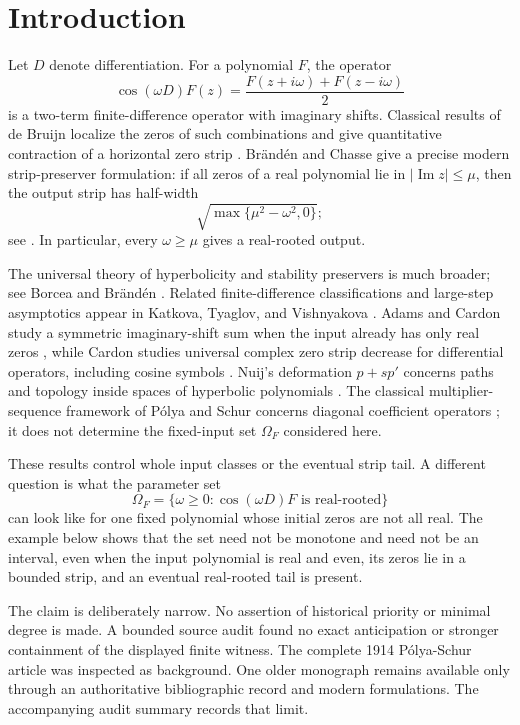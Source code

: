 \documentclass[11pt]{article}
\newcommand{\OmegaF}{\Omega_F}
\begin{document}
\section{Introduction}

Let $D$ denote differentiation. For a polynomial $F$, the operator
\[
  \cos(\omega D)F(z)
  =\frac{F(z+i\omega)+F(z-i\omega)}{2}
\]
is a two-term finite-difference operator with imaginary shifts. Classical
results of de Bruijn localize the zeros of such combinations and give
quantitative contraction of a horizontal zero strip
\cite{deBruijn1950}. Br\"and\'en and Chasse give a precise modern
strip-preserver formulation: if all zeros of a real polynomial lie in
$|\operatorname{Im}z|\leq\mu$, then the output strip has half-width
\[
  \sqrt{\max\{\mu^2-\omega^2,0\}};
\]
see \cite[Theorem 1.6]{BrandenChasse2017}. In particular, every
$\omega\geq\mu$ gives a real-rooted output.

The universal theory of hyperbolicity and stability preservers is much
broader; see Borcea and Br\"and\'en \cite{BorceaBranden2009}. Related
finite-difference classifications and large-step asymptotics appear in
Katkova, Tyaglov, and Vishnyakova \cite{KTV2020}. Adams and Cardon study a
symmetric imaginary-shift sum when the input already has only real zeros
\cite{AdamsCardon2007}, while Cardon studies universal complex zero strip
decrease for differential operators, including cosine symbols
\cite{Cardon2015}. Nuij's deformation $p+s p'$ concerns paths and topology
inside spaces of hyperbolic polynomials \cite{Nuij1968}. The classical
multiplier-sequence framework of P\'olya and Schur concerns diagonal
coefficient operators \cite{PolyaSchur1914}; it does not determine the
fixed-input set $\OmegaF$ considered here.

These results control whole input classes or the eventual strip tail. A
different question is what the parameter set
\[
  \OmegaF=\{\omega\geq0:\cos(\omega D)F\text{ is real-rooted}\}
\]
can look like for one fixed polynomial whose initial zeros are not all real.
The example below shows that the set need not be monotone and need not be an
interval, even when the input polynomial is real and even, its zeros lie in a bounded strip,
and an eventual real-rooted tail is present.

The claim is deliberately narrow. No assertion of historical priority or
minimal degree is made. A bounded source audit found no exact anticipation
or stronger containment of the displayed finite witness. The complete
1914 P\'olya-Schur article was inspected as background. One older monograph
remains available only through an authoritative bibliographic record and
modern formulations. The accompanying audit summary records that limit.
\end{document}
